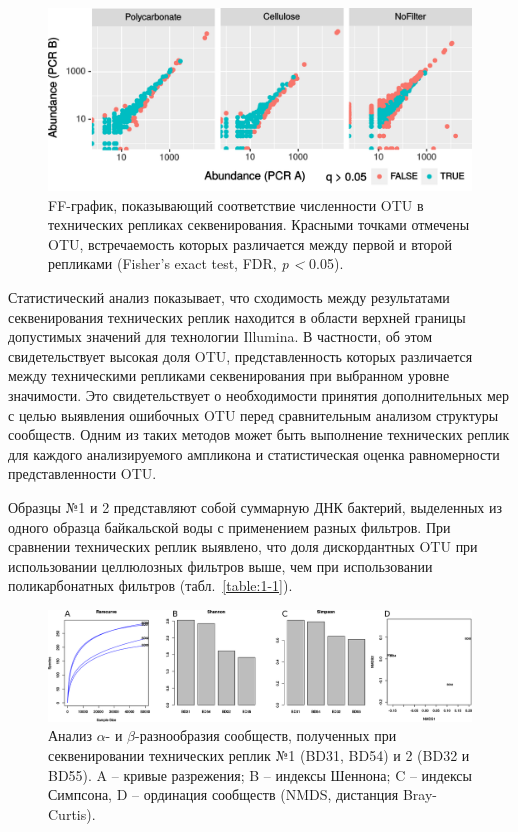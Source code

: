 \documentclass[a4paper,12pt,openany,final]{extreport}
\def\oldcaption{} \let\oldcaption=\caption
\def\caption{\stepcounter{captionsnum}\oldcaption}
\begin{document}
\begin{figure}[bhtp]\centering
\includegraphics[width=0.9\linewidth]{media/image5.png}

\caption{FF-график, показывающий соответствие численности OTU в технических
репликах секвенирования. Красными точками отмечены OTU, встречаемость
которых различается между первой и второй репликами (Fisher's exact
test, FDR, \emph{p \textless{}} 0.05).}\label{fig:1-1}
\end{figure}

Статистический анализ показывает, что сходимость между результатами секвенирования технических реплик находится в области верхней границы допустимых значений для технологии Illumina. В частности, об этом свидетельствует высокая доля OTU, представленность которых различается между техническими репликами секвенирования при выбранном уровне значимости. Это свидетельствует о необходимости принятия дополнительных мер с целью
выявления ошибочных OTU перед сравнительным анализом структуры
сообществ. Одним из таких методов может быть выполнение технических
реплик для каждого анализируемого ампликона и статистическая оценка
равномерности представленности OTU.

Образцы №1 и 2 представляют собой суммарную ДНК бактерий, выделенных из
одного образца байкальской воды с применением разных фильтров. При
сравнении технических реплик выявлено, что доля дискордантных OTU при
использовании целлюлозных фильтров выше, чем при использовании
поликарбонатных фильтров (табл.~\ref{table:1-1}).

\begin{figure}\centering
  \includegraphics[width=0.9\linewidth]{media/image6.png}
  \caption{Анализ \(\alpha\)- и \(\beta\)-разнообразия сообществ, полученных при секвенировании
технических реплик №1 (BD31, BD54) и 2 (BD32 и BD55). A -- кривые
разрежения; B -- индексы Шеннона; C -- индексы Симпсона, D -- ординация
сообществ (NMDS, дистанция Bray-Curtis).}\label{fig:2}
\end{figure}
\end{document}
